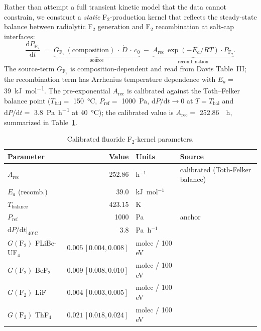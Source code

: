 \documentclass[11pt]{article}
\theoremstyle{plain}
\theoremstyle{definition}
\theoremstyle{remark}
\newcommand{\Ea}{E_a}
\renewcommand{\d}{\mathrm{d}}
\begin{document}
Rather than attempt a full transient kinetic model that the data cannot
constrain, we construct a \emph{static} F$_2$-production kernel that
reflects the steady-state balance between radiolytic F$_2$ generation and
F$_2$ recombination at salt-cap interfaces:
\begin{equation}
\frac{\d P_{\mathrm{F}_2}}{\d t}
   \;=\; \underbrace{G_{\mathrm{F}_2}\,(\mathrm{composition})\,\cdot\,\dot{D}\,\cdot\,c_0}_{\text{source}}
       \;-\; \underbrace{A_{\mathrm{rec}}\,\exp(-\Ea/RT) \cdot P_{\mathrm{F}_2}}_{\text{recombination}}.
\label{eq:fkernel}
\end{equation}
The source-term $G_{\mathrm{F}_2}$ is composition-dependent and read from
Davis Table~III; the recombination term has Arrhenius temperature
dependence with $\Ea =$ \SI{39}{\kilo\joule\per\mol}.  The pre-exponential
$A_{\mathrm{rec}}$ is calibrated against the Toth--Felker balance point
($T_{\mathrm{bal}} = $ \SI{150}{\celsius}, $P_{\mathrm{ref}} =$
\SI{1000}{\pascal}, $\d P/\d t \to 0$ at $T = T_{\mathrm{bal}}$ and
$\d P/\d t = $ \SI{3.8}{\pascal\per\hour} at \SI{40}{\celsius}); the
calibrated value is $A_{\mathrm{rec}} = $ \SI{252.86}{\per\hour}, summarized
in Table~\ref{tab:flu-arr}.

\begin{table}[h!]
\centering
\caption{Calibrated fluoride F$_2$-kernel parameters.}
\label{tab:flu-arr}
\small
\begin{tabular}{lrll}
\toprule
Parameter & Value & Units & Source \\
\midrule
$A_{\mathrm{rec}}$       & 252.86 & h$^{-1}$        & calibrated (Toth-Felker balance)        \\
$\Ea$ (recomb.)          & 39.0   & kJ~mol$^{-1}$   & \citep{Toth1990}                        \\
$T_{\mathrm{balance}}$   & 423.15 & K               & \citep{Toth1990}                        \\
$P_{\mathrm{ref}}$       & 1000   & Pa              & anchor                                  \\
$\d P/\d t|_{40^\circ\mathrm{C}}$ & 3.8 & Pa~h$^{-1}$ & \citep{Toth1990}                       \\
$G(\mathrm{F}_2)$ FLiBe-UF$_4$    & $0.005\,[0.004,0.008]$ & molec / 100 eV & \citep{Davis2022}        \\
$G(\mathrm{F}_2)$ BeF$_2$         & $0.009\,[0.008,0.010]$ & molec / 100 eV & \citep{Davis2022}        \\
$G(\mathrm{F}_2)$ LiF             & $0.004\,[0.003,0.005]$ & molec / 100 eV & \citep{Davis2022}        \\
$G(\mathrm{F}_2)$ ThF$_4$         & $0.021\,[0.018,0.024]$ & molec / 100 eV & \citep{Davis2022}        \\
\bottomrule
\end{tabular}
\end{table}
\end{document}
